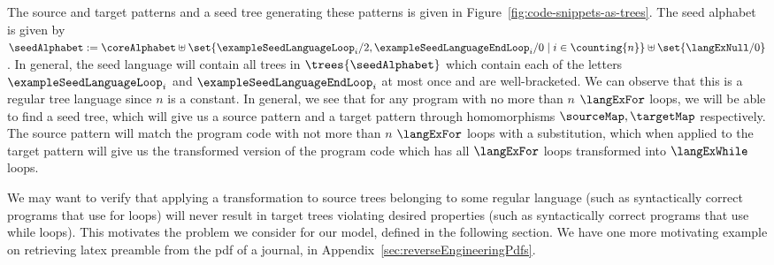 The source and target patterns and a seed tree generating these patterns is given in Figure~\ref{fig:code-snippets-as-trees}. The seed alphabet is given by $\seedAlphabet := \coreAlphabet \uplus \set{\exampleSeedLanguageLoop_i/2, \exampleSeedLanguageEndLoop_i/0 \mid i \in \counting{n}} \uplus \set{\langExNull/0}$. In general, the seed language will contain all trees in $\trees{\seedAlphabet}$ which contain each of the letters $\exampleSeedLanguageLoop_i$ and $\exampleSeedLanguageEndLoop_i$ at most once and are well-bracketed. We can observe that this is a regular tree language since $n$ is a constant. In general, we see that for any program with no more than $n$ $\langExFor$ loops, we will be able to find a seed tree, which will give us a source pattern and a target pattern through homomorphisms $\sourceMap, \targetMap$ respectively. The source pattern will match the program code with not more than $n$ $\langExFor$ loops with a substitution, which when applied to the target pattern will give us the transformed version of the program code which has all $\langExFor$ loops transformed into $\langExWhile$ loops. 

We may want to verify that applying a transformation to source trees belonging to some regular language (such as syntactically correct programs that use for loops) will never result in target trees violating desired properties (such as syntactically correct programs that use while loops). This motivates the problem we consider for our model, defined in the following section. We have one more motivating example on retrieving latex preamble from the pdf of a journal, in Appendix~\ref{sec:reverseEngineeringPdfs}.
